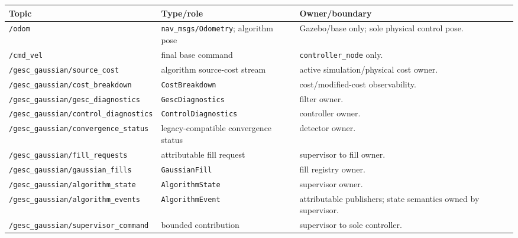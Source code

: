 \documentclass[
  10pt,
  letterpaper,
]{article}
\newcounter{none} %
\begin{document}
{\def\LTcaptype{none} %
\begin{longtable}[]{@{}
  >{\raggedright\arraybackslash}p{}
  >{\raggedright\arraybackslash}p{}
  >{\raggedright\arraybackslash}p{}@{}}
\toprule\noalign{}
\begin{minipage}[b]{\linewidth}\raggedright
Topic
\end{minipage} & \begin{minipage}[b]{\linewidth}\raggedright
Type/role
\end{minipage} & \begin{minipage}[b]{\linewidth}\raggedright
Owner/boundary
\end{minipage} \\
\midrule\noalign{}
\endhead
\bottomrule\noalign{}
\endlastfoot
\nolinkurl{/odom} & \nolinkurl{nav\_msgs/Odometry}; algorithm pose & Gazebo/base only; sole physical control pose. \\
\nolinkurl{/cmd\_vel} & final base command & \nolinkurl{controller\_node} only. \\
\nolinkurl{/gesc\_gaussian/source\_cost} & algorithm source-cost stream & active simulation/physical cost owner. \\
\nolinkurl{/gesc\_gaussian/cost\_breakdown} & \nolinkurl{CostBreakdown} & cost/modified-cost observability. \\
\nolinkurl{/gesc\_gaussian/gesc\_diagnostics} & \nolinkurl{GescDiagnostics} & filter owner. \\
\nolinkurl{/gesc\_gaussian/control\_diagnostics} & \nolinkurl{ControlDiagnostics} & controller owner. \\
\nolinkurl{/gesc\_gaussian/convergence\_status} & legacy-compatible convergence status & detector owner. \\
\nolinkurl{/gesc\_gaussian/fill\_requests} & attributable fill request & supervisor to fill owner. \\
\nolinkurl{/gesc\_gaussian/gaussian\_fills} & \nolinkurl{GaussianFill} & fill registry owner. \\
\nolinkurl{/gesc\_gaussian/algorithm\_state} & \nolinkurl{AlgorithmState} & supervisor owner. \\
\nolinkurl{/gesc\_gaussian/algorithm\_events} & \nolinkurl{AlgorithmEvent} & attributable publishers; state semantics owned by supervisor. \\
\nolinkurl{/gesc\_gaussian/supervisor\_command} & bounded contribution & supervisor to sole controller. \\

\end{longtable}}
\end{document}
